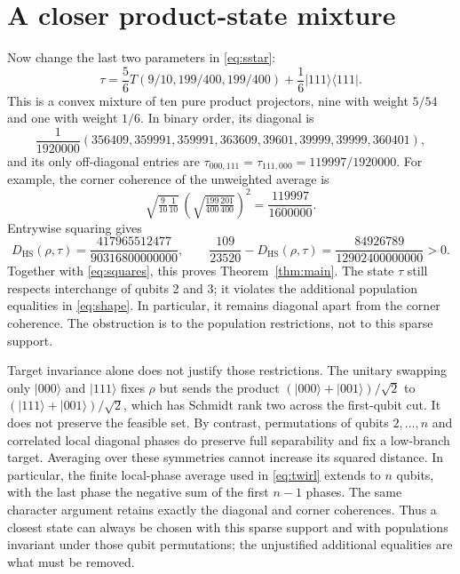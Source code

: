 \documentclass[11pt]{article}
\newcommand{\ket}[1]{\lvert #1\rangle}
\newcommand{\bra}[1]{\langle #1\rvert}
\newcommand{\proj}[1]{\ket{#1}\!\bra{#1}}
\newcommand{\D}{D_{\mathrm{HS}}}
\begin{document}
\section{A closer product-state mixture}
Now change the last two parameters in \eqref{eq:sstar}:
\begin{equation}\label{eq:tau}
 \tau=\frac56T(9/10,199/400,199/400)+\frac16\proj{111}.
\end{equation}
This is a convex mixture of ten pure product projectors, nine with weight
$5/54$ and one with weight $1/6$. In binary order, its diagonal is
\[
 \frac1{1920000}(356409,359991,359991,363609,
                 39601,39999,39999,360401),
\]
and its only off-diagonal entries are
$\tau_{000,111}=\tau_{111,000}=119997/1920000$.
For example, the corner coherence of the unweighted average is
\[
 \sqrt{\tfrac9{10}\tfrac1{10}}\,
 \left(\sqrt{\tfrac{199}{400}\tfrac{201}{400}}\right)^2
 =\frac{119997}{1600000}.
\]
Entrywise squaring gives
\begin{equation}\label{eq:gap}
 \D(\rho,\tau)=\frac{417965512477}{90316800000000},\qquad
 \frac{109}{23520}-\D(\rho,\tau)
   =\frac{84926789}{12902400000000}>0.
\end{equation}
Together with \eqref{eq:squares}, this proves Theorem~\ref{thm:main}.
The state $\tau$ still respects interchange of qubits 2 and 3; it violates
the additional population equalities in \eqref{eq:shape}.
In particular, it remains diagonal apart from the corner coherence.
The obstruction is to the population restrictions, not to this sparse support.

Target invariance alone does not justify those restrictions. The unitary
swapping only $\ket{000}$ and $\ket{111}$ fixes $\rho$ but sends the product
$(\ket{000}+\ket{001})/\sqrt2$ to
$(\ket{111}+\ket{001})/\sqrt2$, which has Schmidt rank two across the
first-qubit cut. It does not preserve the feasible set.
By contrast, permutations of qubits $2,\ldots,n$ and correlated local
diagonal phases do preserve full separability and fix a low-branch target.
Averaging over these symmetries cannot increase its squared distance.
In particular, the finite local-phase average used in \eqref{eq:twirl}
extends to $n$ qubits, with the last phase the negative sum of the first
$n-1$ phases. The same character argument retains exactly the diagonal and
corner coherences. Thus a closest state can always be chosen with this
sparse support and with populations invariant under those qubit permutations;
the unjustified additional equalities are what must be removed.
\end{document}
